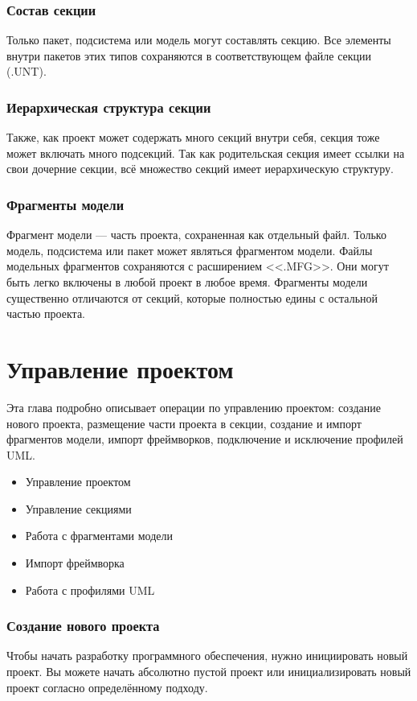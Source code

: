 \documentclass[a4paper,12pt]{extreport}
\begin{document}
\subsection*{Состав секции}
Только пакет, подсистема или модель могут составлять секцию. Все элементы внутри пакетов
этих типов сохраняются в соответствующем файле секции (.UNT).
\subsection*{Иерархическая структура секции}
Также, как проект может содержать много секций внутри себя, секция тоже может включать
много подсекций. Так как родительская секция имеет ссылки на свои дочерние секции, всё
множество секций имеет иерархическую структуру.
\subsection*{Фрагменты модели}
Фрагмент модели --- часть проекта, сохраненная как отдельный файл. Только модель, подсистема
или пакет может являться фрагментом модели. Файлы модельных фрагментов сохраняются с
расширением <<.MFG>>. Они могут быть легко включены в любой проект в любое время. Фрагменты
модели существенно отличаются от секций, которые полностью едины с остальной частью
проекта.

\chapter{Управление проектом}
Эта глава подробно описывает операции по управлению проектом: создание нового проекта,
размещение части проекта в секции, создание и импорт фрагментов модели, импорт фреймворков,
подключение и исключение профилей UML.
\begin{itemize}
	\item Управление проектом
	\item Управление секциями
	\item Работа с фрагментами модели
	\item Импорт фреймворка
	\item Работа с профилями UML
\end{itemize}

\subsection*{Создание нового проекта}
Чтобы начать разработку программного обеспечения, нужно инициировать новый проект. Вы
можете начать абсолютно пустой проект или инициализировать новый проект согласно
определённому подходу.
\end{document}
